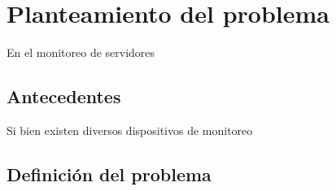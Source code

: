 \section{Planteamiento del problema}




En el monitoreo de servidores


\subsection{Antecedentes}\label{sec:Ant}

Si bien existen diversos dispositivos de monitoreo

\subsection{Definición del problema}
